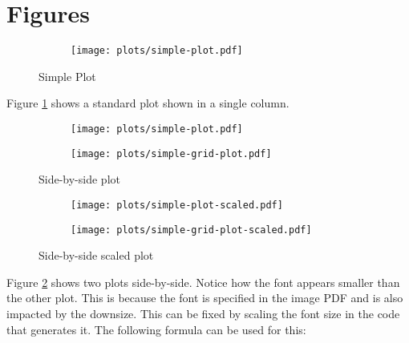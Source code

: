 \documentclass[12pt,twocolumn]{article}
\begin{document}


\section{Figures}

\begin{figure}
    \centering
    \begin{subfigure}[b]{0.48\textwidth}
        \centering
        \texttt{[image: plots/simple-plot.pdf]}
    \end{subfigure}
    \caption{Simple Plot}
    \label{fig:simple-plot}
\end{figure}


Figure \ref{fig:simple-plot} shows a standard plot shown in a single column.


\begin{figure}[h]
    \centering
    \begin{subfigure}[b]{0.24\textwidth}
        \centering
        \texttt{[image: plots/simple-plot.pdf]}
    \end{subfigure}
    \begin{subfigure}[b]{0.24\textwidth}
        \centering
        \texttt{[image: plots/simple-grid-plot.pdf]}
    \end{subfigure}
    \caption{Side-by-side plot}
    \label{fig:side-by-side-plot}
\end{figure}

\begin{figure}[h]
    \centering
    \begin{subfigure}[b]{0.24\textwidth}
        \centering
        \texttt{[image: plots/simple-plot-scaled.pdf]}
    \end{subfigure}
    \begin{subfigure}[b]{0.24\textwidth}
        \centering
        \texttt{[image: plots/simple-grid-plot-scaled.pdf]}
    \end{subfigure}
    \caption{Side-by-side scaled plot}
    \label{fig:side-by-side-scaled-plot}
\end{figure}


Figure \ref{fig:side-by-side-plot} shows two plots side-by-side.
%
Notice how the font appears smaller than the other plot.
%
This is because the font is specified in the image PDF and is also impacted by the downsize.
%
This can be fixed by scaling the font size in the code that generates it.
%
The following formula can be used for this:
\end{document}

